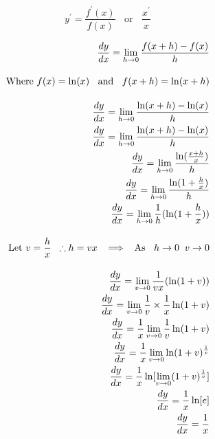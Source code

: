 \documentclass[12pt letter]{report}
\begin{document}
\[
	y^{\prime} = \frac{f^{\prime}(x)}{f(x)} \;\; \text{ or } \;\; \frac{x^{\prime}}{x}
\]
\begin{myproof}
	\begingroup
	\allowdisplaybreaks
	\begin{align*}
		\frac{dy}{dx} = \lim_{h \to 0} \frac{f(x+h) - f(x)}{h}                                                    \\[10pt]
		\text{Where } f(x) = \ln(x) \;\; \text{ and } \;\; f(x+h) = \ln(x+h)                                      \\[10pt]
		\frac{dy}{dx} = \lim_{h \to 0} \frac{\ln(x+h) - \ln(x)}{h}                                                \\
		\frac{dy}{dx} = \lim_{h \to 0} \frac{\ln(x+h) - \ln(x)}{h}                                                \\
		\frac{dy}{dx} = \lim_{h \to 0} \frac{\ln(\frac{x+h}{x})}{h}                                               \\
		\frac{dy}{dx} = \lim_{h \to 0} \frac{\ln(1+\frac{h}{x})}{h}                                               \\
		\frac{dy}{dx} = \lim_{h \to 0} \frac{1}{h}(\ln(1+\frac{h}{x}))                                            \\[10pt]
		\text{Let } v = \frac{h}{x} \;\; \therefore h = vx \;\; \implies \;\; \text{As } \;\; h\to 0 \;\; v \to 0 \\[10pt]
		\pagebreak
		\frac{dy}{dx} = \lim_{v \to 0} \frac{1}{vx}(\ln(1+v))                                                     \\
		\frac{dy}{dx} = \lim_{v \to 0} \frac{1}{v}  \times \frac{1}{x}\ln(1+v)                                    \\
		\frac{dy}{dx} = \frac{1}{x} \lim_{v \to 0} \frac{1}{v} \ln(1+v)                                           \\
		\frac{dy}{dx}= \frac{1}{x} \lim_{v \to 0} \ln(1+v)^{\frac{1}{v}}                                          \\
		\frac{dy}{dx} = \frac{1}{x}\ln[\lim_{v \to 0} (1+v)^{\frac{1}{v}} ]                                       \\
		\frac{dy}{dx} = \frac{1}{x}\ln[e]                                                                         \\
		\frac{dy}{dx} = \frac{1}{x}                                                                               \\
	\end{align*}
	\endgroup
\end{myproof}
\end{document}
